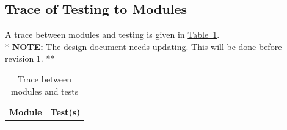 \documentclass[12pt, titlepage]{article}
\begin{document}
\subsection{Trace of Testing to Modules}
A trace between modules and testing is given in \hyperref[tab:tracemod]{Table~\ref*{tab:tracemod}}.\\

\noindent** {\bf NOTE:} The design document needs updating.  This will be done before revision 1. **
\begin{table}[ht]
\caption{Trace between modules and tests} \label{tab:tracemod}
\begin{tabularx}{\textwidth}{p{5cm}X}
\toprule {\bf Module} & {\bf Test(s)}\\
\midrule
&\\
\bottomrule
\end{tabularx}
\end{table}
\end{document}
